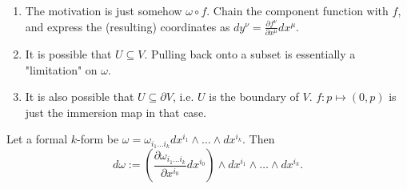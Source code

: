 \documentclass[../main.tex]{subfiles}
\begin{document}
    \begin{remark}
        \begin{enumerate}
            \item The motivation is just somehow \(\omega\circ f\). Chain the
            component function with \(f\), and express the (resulting) coordinates 
            as \(dy^{\nu} = \frac{\partial f^{\nu}}{\partial x^{\mu}}dx^{\mu}\).
            \item It is possible that \(U \subseteq V\). Pulling back onto a subset 
            is essentially a "limitation" on \(\omega\).
            \item It is also possible that \(U \subseteq \partial V\), i.e. \(U\) is 
            the boundary of \(V\). \(f : p \mapsto (0, p)\) is just the 
            immersion map in that case.
        \end{enumerate}
    \end{remark}
    \begin{definition}\label{def:formal-exterior-diff}
        Let a formal \(k\)-form be
        \(\omega = \omega_{i_1\dots i_k} dx^{i_1} \wedge \dots \wedge dx^{i_k}\). 
        Then 
        \[
        d\omega := \left(\frac{\partial \omega_{i_1\dots i_k}}{\partial x^{i_0}}
        dx^{i_0}\right) 
        \wedge dx^{i_1} \wedge \dots \wedge dx^{i_k}.
        \]
    \end{definition}
\end{document}
